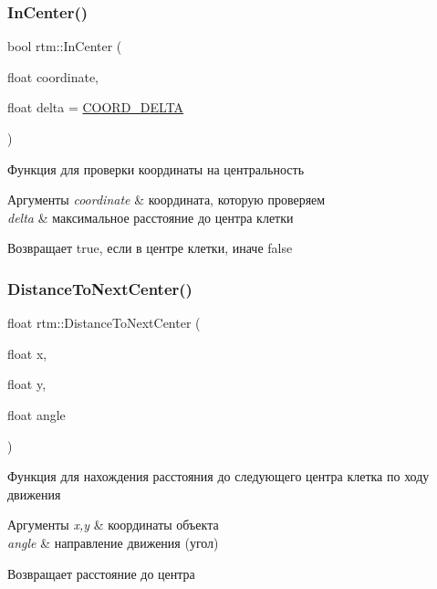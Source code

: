 \subsubsection{\texorpdfstring{In\+Center()}{InCenter()}}
{\footnotesize\ttfamily bool rtm\+::\+In\+Center (\begin{DoxyParamCaption}\item[{float}]{coordinate,  }\item[{float}]{delta = {\ttfamily \hyperlink{namespacertm_a9ae158a8873bdf59aa9872cdada6c657}{C\+O\+O\+R\+D\+\_\+\+D\+E\+L\+TA}} }\end{DoxyParamCaption})}

Функция для проверки координаты на центральность 
\begin{DoxyParams}{Аргументы}
{\em coordinate} & координата, которую проверяем \\
\hline
{\em delta} & максимальное расстояние до центра клетки \\
\hline
\end{DoxyParams}
\begin{DoxyReturn}{Возвращает}
true, если в центре клетки, иначе false 
\end{DoxyReturn}
\mbox{\label{namespacertm_aa546266dce0a8d2a50a7fe311e514668}} 
\subsubsection{\texorpdfstring{Distance\+To\+Next\+Center()}{DistanceToNextCenter()}}
{\footnotesize\ttfamily float rtm\+::\+Distance\+To\+Next\+Center (\begin{DoxyParamCaption}\item[{float}]{x,  }\item[{float}]{y,  }\item[{float}]{angle }\end{DoxyParamCaption})}

Функция для нахождения расстояния до следующего центра клетка по ходу движения 
\begin{DoxyParams}{Аргументы}
{\em x,y} & координаты объекта \\
\hline
{\em angle} & направление движения (угол) \\
\hline
\end{DoxyParams}
\begin{DoxyReturn}{Возвращает}
расстояние до центра 
\end{DoxyReturn}
\mbox{\label{namespacertm_a69199b6d204d2ebf33b76e5a7ad52876}} 
